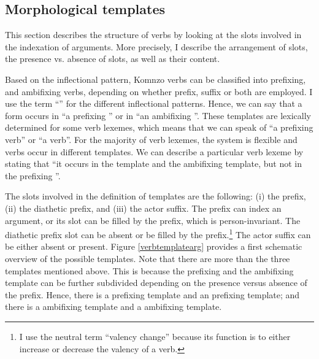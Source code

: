 \subsection{Morphological templates}\label{morphologicaltemplates}

This section describes the structure of verbs by looking at the slots involved in the indexation of arguments. More precisely, I describe the arrangement of slots, the presence vs. absence of slots, as well as their content.

Based on the inflectional pattern, Komnzo verbs can be classified into prefixing,  and ambifixing verbs, depending on whether prefix, suffix or both are employed. I use the term ``'' for the different inflectional patterns. Hence, we can say that a  form occurs in ``a prefixing '' or in ``an ambifixing ''. These templates are lexically determined for some verb lexemes, which means that we can speak of ``a prefixing verb'' or ``a  verb''. For the majority of verb lexemes, the system is flexible and verbs occur in different templates. We can describe a particular verb lexeme by stating that ``it occurs in the  template and the ambifixing template, but not in the prefixing ''.

The slots involved in the definition of templates are the following: (i) the  prefix, (ii) the diathetic prefix, and (iii) the actor suffix. The  prefix can index an argument, or its slot can be filled by the  prefix, which is person-invariant. The diathetic prefix slot can be absent or be filled by the  prefix.\footnote{I use the neutral term ``valency change'' because its function is to either increase or decrease the valency of a verb.} The actor suffix can be either absent or present. Figure \ref{verbtemplatearg} provides a first schematic overview of the possible templates. Note that there are more than the three templates mentioned above. This is because the prefixing and the ambifixing template can be further subdivided depending on the presence versus absence of the  prefix. Hence, there is a prefixing template and an  prefixing template; and there is a  ambifixing template and a  ambifixing template.

